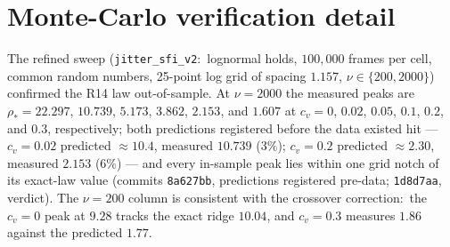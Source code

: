 \documentclass[10pt]{article}
\begin{document}
\section{Monte-Carlo verification detail}
\label{sec:s-verification}
The refined sweep (\texttt{jitter\_sfi\_v2}:\ lognormal holds, $100{,}000$
frames per cell, common random numbers, 25-point log grid of spacing
$1.157$, $\nu \in \{200, 2000\}$) confirmed the R14 law out-of-sample. At
$\nu = 2000$ the measured peaks are $\rho_{*} = 22.297$, $10.739$, $5.173$,
$3.862$, $2.153$, and $1.607$ at $c_v = 0$, $0.02$, $0.05$, $0.1$, $0.2$,
and $0.3$, respectively; both predictions
registered before the data existed hit --- $c_v = 0.02$ predicted
$\approx10.4$, measured $10.739$ ($3\%$); $c_v = 0.2$ predicted
$\approx2.30$, measured $2.153$ ($6\%$) --- and every in-sample peak lies
within one grid notch of its exact-law value (commits \texttt{8a627bb},
predictions registered pre-data; \texttt{1d8d7aa}, verdict). The $\nu = 200$
column is consistent with the crossover correction:\ the $c_v = 0$ peak at
$9.28$ tracks the exact ridge $10.04$, and $c_v = 0.3$ measures $1.86$
against the predicted $1.77$.
\end{document}

